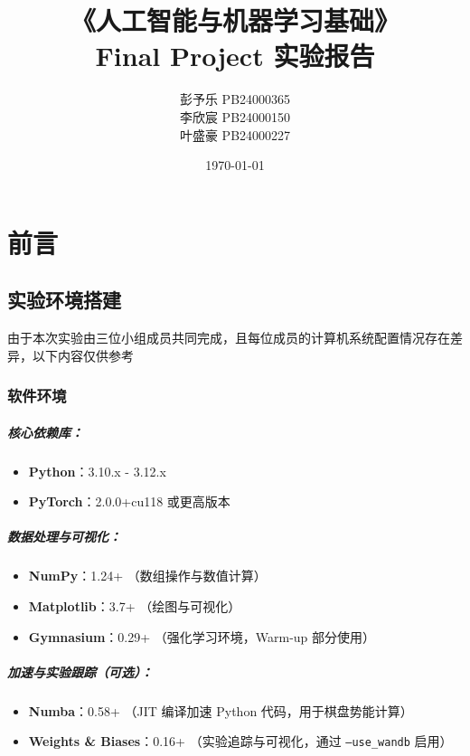 \documentclass[oneside]{ctexbook}
\title{\bf 《人工智能与机器学习基础》\\Final Project 实验报告}
\author{彭予乐 PB24000365 \\ 李欣宸 PB24000150 \\ 叶盛豪 PB24000227}
\date{\today}
\begin{document}
\maketitle

\frontmatter  %

\chapter{前言}

\section{实验环境搭建}

由于本次实验由三位小组成员共同完成，且每位成员的计算机系统配置情况存在差异，以下内容仅供参考

\subsection{软件环境}

\paragraph{核心依赖库：}
\begin{itemize}
    \item \textbf{Python}：3.10.x - 3.12.x
    \item \textbf{PyTorch}：2.0.0+cu118 或更高版本
\end{itemize}

\paragraph{数据处理与可视化：}
\begin{itemize}
    \item \textbf{NumPy}：1.24+ （数组操作与数值计算）
    \item \textbf{Matplotlib}：3.7+ （绘图与可视化）
    \item \textbf{Gymnasium}：0.29+ （强化学习环境，Warm-up 部分使用）
\end{itemize}

\paragraph{加速与实验跟踪（可选）：}
\begin{itemize}
    \item \textbf{Numba}：0.58+ （JIT 编译加速 Python 代码，用于棋盘势能计算）
    \item \textbf{Weights \& Biases}：0.16+ （实验追踪与可视化，通过 \texttt{--use\_wandb} 启用）
\end{itemize}
\end{document}
